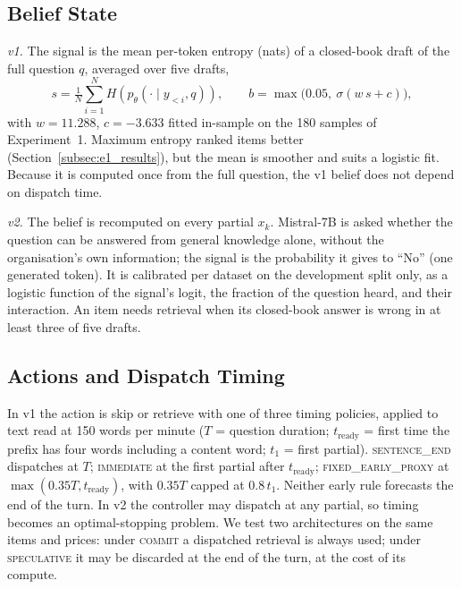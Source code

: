 \subsection{Belief State}
\label{subsec:belief_state}

\textit{v1.} The signal is the mean per-token entropy (nats) of a closed-book
draft of the full question $q$, averaged over five drafts,
\begin{equation}
s=\tfrac{1}{N}\textstyle\sum_{i=1}^{N}H\!\left(p_\theta(\cdot\mid y_{<i},q)\right),\qquad
b=\max\!\big(0.05,\ \sigma(w\,s+c)\big),
\label{eq:belief}
\end{equation}
with $w=11.288$, $c=-3.633$ fitted in-sample on the 180 samples of
Experiment~1. Maximum entropy ranked items better
(Section~\ref{subsec:e1_results}), but the mean is smoother and suits a
logistic fit. Because it is computed once from the full question, the v1
belief does not depend on dispatch time.

\textit{v2.} The belief is recomputed on every partial $x_k$. Mistral-7B is
asked whether the question can be answered from general knowledge alone,
without the organisation's own information; the signal is the probability it
gives to ``No'' (one generated token). It is calibrated per dataset on the
development split only, as a logistic function of the signal's logit, the
fraction of the question heard, and their interaction. An item needs
retrieval when its closed-book answer is wrong in at least three of five
drafts.

\subsection{Actions and Dispatch Timing}
\label{subsec:action_space}

In v1 the action is skip or retrieve with one of three timing policies,
applied to text read at 150 words per minute ($T$ = question duration;
$t_{\text{ready}}$ = first time the prefix has four words including a content
word; $t_1$ = first partial). \textsc{sentence\_end} dispatches at $T$;
\textsc{immediate} at the first partial after $t_{\text{ready}}$;
\textsc{fixed\_early\_proxy} at $\max(0.35T, t_{\text{ready}})$, with $0.35T$
capped at $0.8\,t_1$. Neither early rule forecasts the end of the turn. In v2
the controller may dispatch at any partial, so timing becomes an
optimal-stopping problem. We test two architectures on the same items and
prices: under \textsc{commit} a dispatched retrieval is always used; under
\textsc{speculative} it may be discarded at the end of the turn, at the cost
of its compute.

